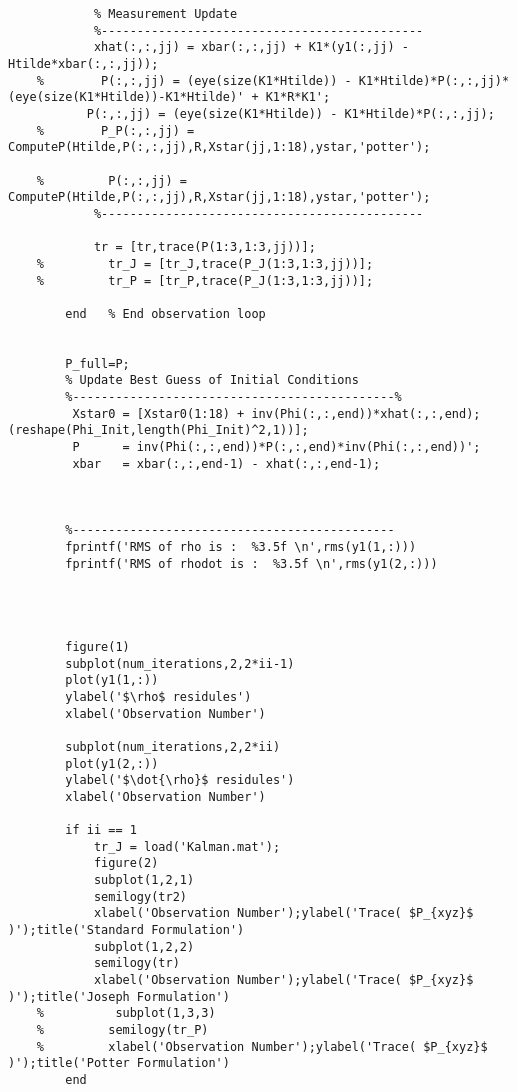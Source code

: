\documentclass[12pt,a4paper,oneside]{article}
\numberwithin{equation}{section}   		%
\begin{document}
\begin{appendices}
\begin{lstlisting}
	        % Measurement Update
	        %---------------------------------------------
	        xhat(:,:,jj) = xbar(:,:,jj) + K1*(y1(:,jj) - Htilde*xbar(:,:,jj));
	%        P(:,:,jj) = (eye(size(K1*Htilde)) - K1*Htilde)*P(:,:,jj)*(eye(size(K1*Htilde))-K1*Htilde)' + K1*R*K1';
	       P(:,:,jj) = (eye(size(K1*Htilde)) - K1*Htilde)*P(:,:,jj);
	%        P_P(:,:,jj) = ComputeP(Htilde,P(:,:,jj),R,Xstar(jj,1:18),ystar,'potter');
	       
	%         P(:,:,jj) = ComputeP(Htilde,P(:,:,jj),R,Xstar(jj,1:18),ystar,'potter');
	        %---------------------------------------------
	              
	        tr = [tr,trace(P(1:3,1:3,jj))];
	%         tr_J = [tr_J,trace(P_J(1:3,1:3,jj))];
	%         tr_P = [tr_P,trace(P_J(1:3,1:3,jj))];
	                                                               
	    end   % End observation loop
	    
	            
	    P_full=P;    
	    % Update Best Guess of Initial Conditions
	    %---------------------------------------------%     
	     Xstar0 = [Xstar0(1:18) + inv(Phi(:,:,end))*xhat(:,:,end); (reshape(Phi_Init,length(Phi_Init)^2,1))];
	     P      = inv(Phi(:,:,end))*P(:,:,end)*inv(Phi(:,:,end))';
	     xbar   = xbar(:,:,end-1) - xhat(:,:,end-1);
	
	
	
	    %--------------------------------------------- 
	    fprintf('RMS of rho is :  %3.5f \n',rms(y1(1,:)))
	    fprintf('RMS of rhodot is :  %3.5f \n',rms(y1(2,:)))
	
	
	    
	    
	    figure(1)
	    subplot(num_iterations,2,2*ii-1)
	    plot(y1(1,:))
	    ylabel('$\rho$ residules')
	    xlabel('Observation Number')
	    
	    subplot(num_iterations,2,2*ii)
	    plot(y1(2,:))
	    ylabel('$\dot{\rho}$ residules')
	    xlabel('Observation Number')
	    
	    if ii == 1
	        tr_J = load('Kalman.mat');
	        figure(2)
	        subplot(1,2,1)
	        semilogy(tr2)
	        xlabel('Observation Number');ylabel('Trace( $P_{xyz}$ )');title('Standard Formulation')
	        subplot(1,2,2)
	        semilogy(tr)
	        xlabel('Observation Number');ylabel('Trace( $P_{xyz}$ )');title('Joseph Formulation')
	%          subplot(1,3,3)
	%         semilogy(tr_P)
	%         xlabel('Observation Number');ylabel('Trace( $P_{xyz}$ )');title('Potter Formulation')
	    end
	    

\end{lstlisting}
\end{appendices}
\end{document}
